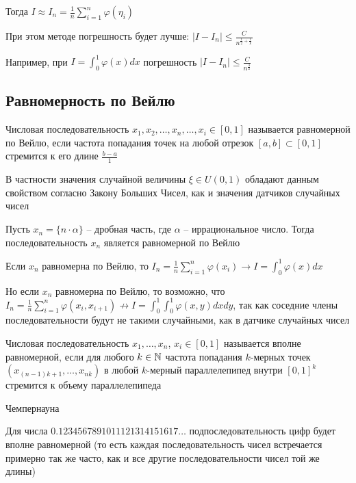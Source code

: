 \documentclass[12pt]{article}
\begin{document}
Тогда $I \approx I_n = \frac{1}{n} \sum_{i = 1}^n \varphi(\eta_i)$

При этом методе погрешность будет лучше: $|I - I_n| \leq \frac{C}{n^{\frac{1}{2} + \frac{1}{k}}}$

Например, при $I = \int_0^1 \varphi(x) dx$ погрешность $|I - I_n| \leq \frac{C}{n^\frac{3}{2}}$

\subsection{Равномерность по Вейлю}

\Def Числовая последовательность $x_1, x_2, \dots, x_n, \dots, x_i \in [0, 1]$ называется равномерной по Вейлю, если частота попадания точек на любой отрезок $[a, b] \subset [0, 1]$ стремится к его длине $\frac{b - a}{1}$

В частности значения случайной величины $\xi \in U(0, 1)$ обладают данным свойством согласно Закону Больших Чисел, как и значения датчиков случайных чисел 

\begin{MyTheorem}
    \Ths Пусть $x_n = \{n \cdot \alpha\}$ -- дробная часть, где $\alpha$ -- иррациональное число. Тогда последовательность $x_n$ является равномерной по Вейлю
\end{MyTheorem}

Если $x_n$ равномерна по Вейлю, то $I_n = \frac{1}{n} \sum_{i = 1}^n \varphi(x_i) \longrightarrow I = \int_0^1 \varphi(x) dx$

\Nota Но если $x_n$ равномерна по Вейлю, то возможно, что $I_n = \frac{1}{n} \sum_{i = 1}^n \varphi(x_i, x_{i + 1}) \not\longrightarrow I = \int_0^1 \int_0^1 \varphi(x, y) dx dy$, так как соседние члены последовательности будут не такими случайными, как в датчике случайных чисел 

\Def Числовая последовательность $x_1, \dots, x_n$, $x_i \in [0, 1]$ называется вполне равномерной, если для любого $k \in \mathbb{N}$ частота попадания $k$-мерных точек $(x_{(n - 1) k + 1}, \dots, x_{nk})$ в любой $k$-мерный параллелепипед внутри $[0, 1]^k$ стремится к объему параллелепипеда

\begin{MyTheorem}
    \Ths Чемпернауна

    Для числа $0.1234567891011121314151617\dots$ подпоследовательность цифр будет вполне равномерной (то есть каждая последовательность чисел встречается примерно так же часто, как и все другие последовательности чисел той же длины)
\end{MyTheorem}
\end{document}
